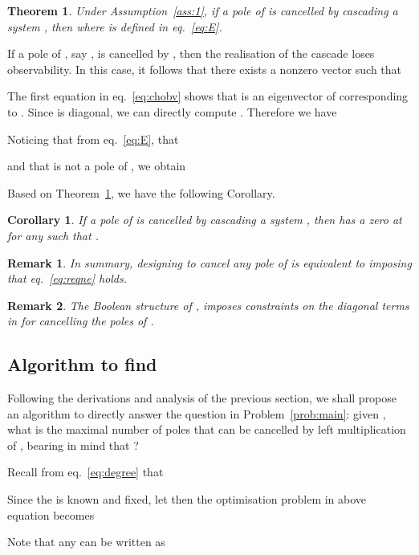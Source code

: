 \documentclass[twocolumn,12pt]{autart}
\theoremstyle{plain}
\newtheorem{theorem}{Theorem}
\newtheorem{corollary}{Corollary}
\newtheorem{remark}{Remark}
\newenvironment{proof}[1][Proof]{\begin{trivlist} \item[\hskip \labelsep {\bfseries #1}]}{\end{trivlist}}
\begin{document}
\begin{theorem}\label{thm:cancelp}
Under Assumption~\ref{ass:1}, if a pole  of  is cancelled by cascading a system , then
where  is defined in eq.~\eqref{eq:E}.
\end{theorem}
\begin{proof}
If a pole of , say , is cancelled by , then the realisation of the
cascade  loses
observability. In this case, it follows that there exists a nonzero vector
 such that

The first equation in eq.~\eqref{eq:chobv} shows that  is an eigenvector of
 corresponding to . Since
 is diagonal, we can directly compute . Therefore we have

Noticing that  from eq.~\eqref{eq:E}, that

and that  is not a pole of , we obtain

\end{proof}

Based on Theorem~\ref{thm:cancelp}, we have the following Corollary.
\begin{corollary}\label{coro:cancelp}
If a pole  of  is cancelled by cascading a system , then  has a zero at  for any  such that .
\end{corollary}

\begin{remark}
In summary, designing  to cancel any pole
 of  is equivalent to imposing that
eq.~\eqref{eq:reqne} holds. 
\end{remark}

\begin{remark}
The Boolean structure of ,  imposes constraints on the diagonal terms in  for cancelling the poles of .
\end{remark}


\subsection{Algorithm to find }\label{se:4.2}
Following the derivations and analysis of the previous section, we shall propose an algorithm to directly answer the question in Problem~\ref{prob:main}: given , what is the maximal number of poles that can be cancelled by left multiplication of , bearing in mind that ? 

Recall from eq.~\eqref{eq:degree} that 

Since the  is known and fixed, let  then the optimisation problem in above equation becomes

Note that any  can be written as 
\end{document}
